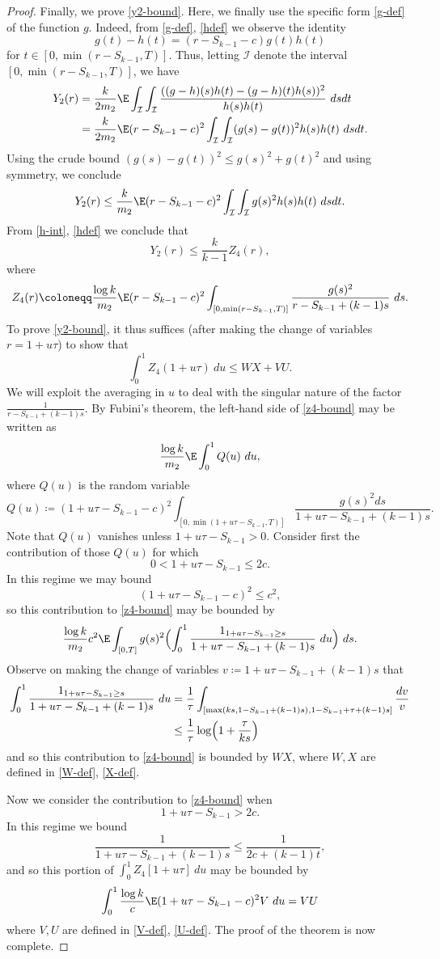 \begin{proof}
Finally, we prove \eqref{y2-bound}.  Here, we finally use the specific form \eqref{g-def} of the function $g$.  Indeed, from \eqref{g-def}, \eqref{hdef} we observe the identity
$$ g(t) - h(t) = (r - S_{k-1} - c) g(t) h(t)$$
for $t \in [0, \min(r-S_{k-1},T)]$.  Thus, letting $\mathcal{I}$ denote the interval $[0, \min(r-S_{k-1},T)]$, we have
\begin{align*}
Y_2(r) &= \frac{k}{2 m_2} \E \int_{\mathcal{I}} \int_{\mathcal{I}} \frac{((g-h)(s) h(t)-(g-h)(t) h(s))^2}{h(s) h(t)}\ ds dt \\
&= \frac{k}{2 m_2} \E (r - S_{k-1} - c)^2 \int_{\mathcal{I}} \int_{\mathcal{I}} (g(s)-g(t))^2 h(s) h(t)\ ds dt.
\end{align*}
Using the crude bound $(g(s)-g(t))^2 \leq g(s)^2+g(t)^2$ and using symmetry, we conclude
$$Y_2(r) \leq \frac{k}{m_2} \E (r - S_{k-1} - c)^2 \int_{\mathcal{I}} \int_{\mathcal{I}} g(s)^2 h(s) h(t)\ ds dt.$$
From \eqref{h-int}, \eqref{hdef} we conclude that
$$ Y_2(r) \leq \frac{k}{k-1} Z_4(r), $$
where
$$ Z_4(r) \coloneqq \frac{\log k}{m_2} \E (r - S_{k-1} - c)^2 \int_{[0,\min(r-S_{k-1},T)]} \frac{g(s)^2}{r-S_{k-1}+(k-1)s}\ ds.$$
To prove \eqref{y2-bound}, it thus suffices (after making the change of variables $r = 1 + u \tau$) to show that
\begin{equation}\label{z4-bound}
 \int_0^1 Z_4(1+u\tau)\ du \leq WX+VU.
\end{equation}
We will exploit the averaging in $u$ to deal with the singular nature of the factor $\frac{1}{r-S_{k-1}+(k-1)s}$.  By Fubini's theorem, the left-hand side of \eqref{z4-bound} may be written as
$$ \frac{\log k}{m_2} \E \int_0^1 Q(u)\ du, $$
where $Q(u)$ is the random variable
$$ Q(u) \coloneqq (1+u\tau - S_{k-1} - c)^2 \int_{[0,\min(1+u\tau-S_{k-1},T)]} \frac{g(s)^2 ds}{1+u\tau-S_{k-1}+(k-1)s}.$$
Note that $Q(u)$ vanishes unless $1+u\tau-S_{k-1} > 0$.  Consider first the contribution of those $Q(u)$ for which
$$ 0 < 1+u\tau-S_{k-1} \leq 2c.$$
In this regime we may bound
$$ (1+u\tau-S_{k-1}-c)^2 \leq c^2,$$
so this contribution to \eqref{z4-bound} may be bounded by
$$ \frac{\log k}{m_2} c^2 \E \int_{[0,T]} g(s)^2 \Bigl(\int_0^1 \frac{1_{1+a\tau-S_{k-1} \geq s}}{1+u\tau-S_{k-1}+(k-1)s}\ du\Bigr)\ ds.$$
Observe on making the change of variables $v \coloneqq 1 + u\tau - S_{k-1} + (k-1)s$ that 
\begin{align*}
\int_0^1 \frac{1_{1+u\tau-S_{k-1} \geq s}}{1+u\tau-S_{k-1}+(k-1)s}\ du &= \frac{1}{\tau} \int_{[\max(ks, 1-S_{k-1}+(k-1)s), 1-S_{k-1}+\tau+(k-1)s]} \frac{dv}{v} \\
&\leq \frac{1}{\tau} \log \Bigl(1+\frac{\tau}{ks}\Bigr)
\end{align*}
and so this contribution to \eqref{z4-bound} is bounded by $WX$, where $W,X$ are defined in \eqref{W-def}, \eqref{X-def}.

Now we consider the contribution to \eqref{z4-bound} when
$$ 1+u\tau-S_{k-1} > 2c.$$
In this regime we bound
$$ \frac{1}{1+u\tau-S_{k-1}+(k-1)s} \leq \frac{1}{2c+(k-1)t},$$ 
and so this portion of $\int_0^1 Z_4[1+u\tau]\ du$ may be bounded by 
$$\int_0^1 \frac{\log k}{c} \E (1 + u\tau - S_{k-1} - c)^2 V\ du = VU$$
where $V, U$ are defined in \eqref{V-def}, \eqref{U-def}.  The proof of the theorem is now complete.
\end{proof}

